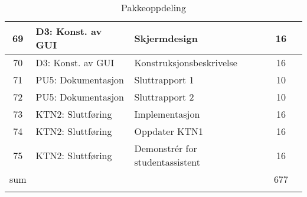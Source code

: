 \begin{longtable}[l]{|c|l|l|c|c|}
	69 & D3: Konst. av GUI & Skjermdesign & 16 & \\ \hline
	70 & D3: Konst. av GUI & Konstruksjonsbeskrivelse & 16 & \\ \hline
	71 & PU5: Dokumentasjon & Sluttrapport  1& 10 & \\ \hline
	72 & PU5: Dokumentasjon & Sluttrapport  2& 10 & \\ \hline
	73 & KTN2: Sluttføring & Implementasjon & 16 & \\ \hline
	74 & KTN2: Sluttføring & Oppdater KTN1 & 16 & \\ \hline
	75 & KTN2: Sluttføring & Demonstrér for studentassistent & 16 & \\ \hline
	sum & & & 677 & \\ \hline \hline

	\caption{Pakkeoppdeling}\\
	\end{longtable}